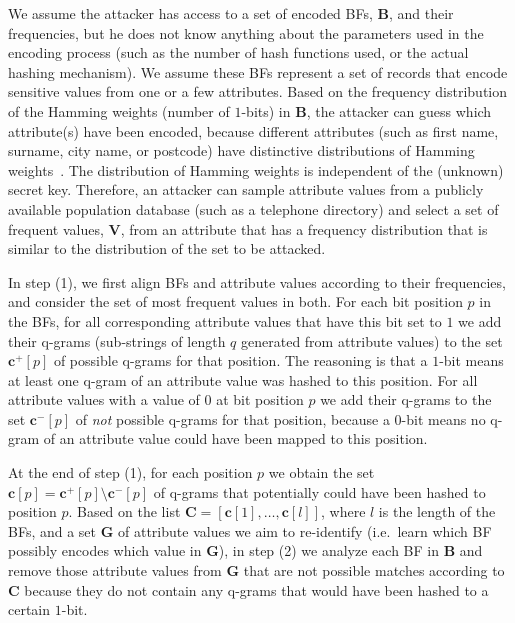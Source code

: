 \documentclass{llncs}
\begin{document}
We assume the attacker has access to a set of encoded BFs,
$\mathbf{B}$, and their frequencies, but he does not know anything
about the parameters used in the encoding process (such as the number
of hash functions used, or the actual hashing mechanism). We assume
these BFs represent a set of records that encode sensitive values
from one or a few attributes. Based on the frequency distribution of
the Hamming weights (number of $1$-bits) in $\mathbf{B}$, the attacker
can guess which attribute(s) have been encoded, because different
attributes (such as first name, surname, city name, or postcode) have
distinctive distributions of Hamming weights~\cite{Sch16}. The
distribution of Hamming weights is independent of the (unknown)
secret key. Therefore, an attacker can sample attribute values from
a publicly available population database (such as a telephone
directory) and select a set of frequent values, $\mathbf{V}$, from
an attribute that has a frequency distribution that is similar to
the distribution of the set to be attacked.

In step (1), we first align BFs and attribute values according to
their frequencies, and consider the set of most frequent values in 
both. For each bit position $p$ in the BFs,
for all corresponding attribute values that have this bit set to $1$
we add their q-grams (sub-strings of length $q$ generated from
attribute values) to the set $\mathbf{c}^+[p]$ of possible
q-grams for that position. The reasoning is that a $1$-bit means at
least one q-gram of an attribute value was hashed to this position.
For all attribute values with a value of $0$ at bit
position $p$ we add their q-grams to the set $\mathbf{c}^-[p]$ of
\emph{not} possible q-grams for that position, because a $0$-bit
means no q-gram of an attribute value could have been mapped to this
position.

At the end of step (1), for each position $p$ we obtain the set
$\mathbf{c}[p] = \mathbf{c}^+[p] \setminus \mathbf{c}^-[p]$ of
q-grams that potentially could have been hashed to position $p$.
Based on the list $\mathbf{C} = [\mathbf{c}[1], \ldots,
\mathbf{c}[l]]$, where $l$ is the length of the BFs, and a set
$\mathbf{G}$ of attribute values we aim to re-identify (i.e.\ learn
which BF possibly encodes which value in $\mathbf{G}$), in step (2)
we analyze each BF in $\mathbf{B}$ and remove those attribute values
from $\mathbf{G}$ that are not possible matches according to
$\mathbf{C}$ because they do not contain any q-grams that would have
been hashed to a certain $1$-bit.
\end{document}
